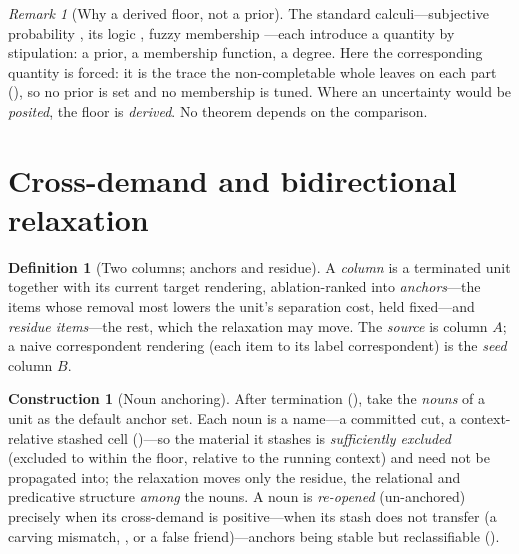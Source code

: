 \documentclass[twocolumn,11pt,a4paper]{article}
\theoremstyle{sup}
\theoremstyle{definition}
\newtheorem{definition}[theorem]{Definition}
\newtheorem{construction}[theorem]{Construction}
\theoremstyle{remark}
\newtheorem{remark}[theorem]{Remark}
\newcommand{\colA}{A}
\newcommand{\colB}{B}
\begin{document}
\begin{remark}[Why a derived floor, not a prior]
\label{rem:bayes}
The standard calculi---subjective probability \citep{definetti1937},
its logic \citep{cox1946,jaynes2003}, fuzzy membership \citep{zadeh1965}---each
introduce a quantity by stipulation: a prior, a membership function, a
degree. Here the corresponding quantity is forced: it is the trace the
non-completable whole leaves on each part (), so no prior is
set and no membership is tuned. Where an uncertainty would be \emph{posited},
the floor is \emph{derived}. No theorem depends on the comparison.
\end{remark}

\section{Cross-demand and bidirectional relaxation}
\label{sec:relaxation}

\begin{definition}[Two columns; anchors and residue]
\label{def:columns}
A \emph{column} is a terminated unit together with its current target rendering,
ablation-ranked into \emph{anchors}---the items whose removal most lowers the
unit's separation cost, held fixed---and \emph{residue items}---the rest, which
the relaxation may move. The \emph{source} is column $\colA$; a naive
correspondent rendering (each item to its label correspondent) is the
\emph{seed} column $\colB$.
\end{definition}

\begin{construction}[Noun anchoring]
\label{con:noun}
After termination (), take the \emph{nouns} of a unit as the
default anchor set. Each noun is a name---a committed cut, a context-relative
stashed cell ()---so the material it
stashes is \emph{sufficiently excluded} (excluded to within the floor, relative to
the running context) and need not be propagated into; the
relaxation moves only the residue, the relational and predicative structure
\emph{among} the nouns. A noun is \emph{re-opened} (un-anchored) precisely when
its cross-demand is positive---when its stash does not transfer (a carving
mismatch, , or a false friend)---anchors being stable but
reclassifiable ().
\end{construction}
\end{document}
